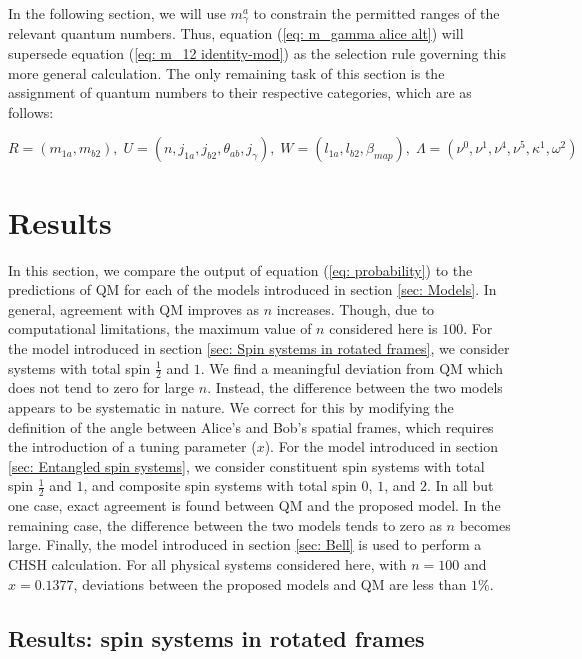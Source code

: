 \documentclass{article}
\begin{document}
In the following section, we will use $m^a_\gamma$ to constrain the permitted ranges of the relevant quantum numbers. Thus, equation (\ref{eq: m_gamma alice alt}) will supersede equation (\ref{eq: m_12 identity-mod}) as the selection rule governing this more general calculation. The only remaining task of this section is the assignment of quantum numbers to their respective categories, which are as follows:

\begin{equation}
    R = (m_{1a},m_{b2}), \;U = (n,j_{1a},j_{b2},\theta_{ab},j_{\gamma}),\;W = (l_{1a},l_{b2},\beta_{map}),\;\Lambda = ( \nu^0,\nu^1,\nu^4,\nu^5, \kappa^1, \omega^2)
\end{equation}


\section{Results \label{sec: results}}


In this section, we compare the output of equation (\ref{eq: probability}) to the predictions of QM  for each of the models introduced in section \ref{sec: Models}. In general, agreement with QM improves as $n$ increases. Though, due to computational limitations, the maximum value of $n$ considered here is $100$.  For the model introduced in section \ref{sec: Spin systems in rotated frames}, we consider systems with total spin $\frac{1}{2}$ and $1$. We find a meaningful deviation from QM which does not tend to zero for large $n$. Instead, the difference between the two models appears to be systematic in nature. We correct for this by modifying the definition of the angle between Alice's and Bob's spatial frames, which requires the introduction of a tuning parameter ($x$). For the model introduced in section \ref{sec: Entangled spin systems}, we consider constituent spin systems with total spin $\frac{1}{2}$ and $1$, and composite spin systems with total spin $0$, $1$, and $2$. In all but one case, exact agreement is found between QM and the proposed model. In the remaining case, the difference between the two models tends to zero as $n$ becomes large. Finally, the model introduced in section \ref{sec: Bell} is used to perform a CHSH calculation. For all physical systems considered here, with $n=100$ and $x=0.1377$, deviations between the proposed models and QM are less than $1\%$. 

\subsection{Results: spin systems in rotated frames \label{sec: rotated frames results}}
\end{document}
